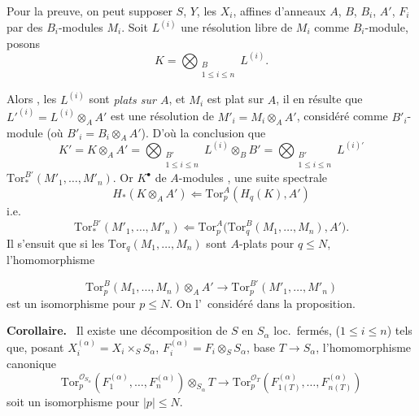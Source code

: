 \documentclass[11pt,a4paper]{article}
\begin{document}
 Pour la preuve, on peut supposer 
$S$, $Y$, les $X_i$, affines d'anneaux $A$, $B$, $B_i$, $A'$, 
$F_i$  par  des $B_i$-modules $M_i$. Soit
$L^{(i)}$ une résolution libre de $M_i$ comme $B_i$-module, posons
\[
  K = \bigotimes_{\substack{B \\ 1 \le i \le n}} L^{(i)} .
\]

Alors \struck{\ill{}}, les $L^{(i)}$ sont \emph{plats sur $A$}, et
 $M_i$ est plat sur $A$, il en résulte que
$L'^{(i)} = L^{(i)} \otimes_A A'$ est une résolution de
$M'_i = M_i \otimes_A A'$, considéré comme $B'_i$-module (où
$B'_i = B_i \otimes_A A'$). D'où la conclusion que
\[
  K' = K \otimes_A A' = \bigotimes_{\substack{B' \\ 1 \le i \le n}}
  L^{(i)} \otimes_B B' = \bigotimes_{\substack{B' \\ 1 \le i \le n}} L^{(i)\prime}
\]
  $\mathrm{Tor}_{*}^{B'}(M'_1, \ldots,
M'_n)$. Or $K^{\bullet}$  de $A$-modules
,  une suite spectrale
\[
  H_{*}(K \otimes_A A') \Longleftarrow \mathrm{Tor}_p^A(H_q(K), A')
\]
i.e.
\[
  \mathrm{Tor}_{*}^{B'}(M'_1, \ldots, M'_n) \Longleftarrow
  \mathrm{Tor}_p^A\bigl(\mathrm{Tor}_q^B(M_1, \ldots, M_n), A'\bigr) .
\]
Il s'ensuit que si les $\mathrm{Tor}_q(M_1, \ldots, M_n)$ sont $A$-plats
pour $q \le N$,  l'homomorphisme 
\ill{} \ill{}

\[
  \mathrm{Tor}_p^B(M_1, \ldots, M_n) \otimes_A A' \longrightarrow
  \mathrm{Tor}_p^{B'}(M'_1, \ldots, M'_n)
\]
est un isomorphisme pour $p \le N$. On  
 l'\ considéré dans la proposition.

\textbf{Corollaire.} \ Il existe une
décomposition  de $S$ en \ill{} $S_\alpha$ loc.\
fermés, ($1 \le i \le n$) tels que, posant
$X_i^{(\alpha)} = X_i \times_S S_\alpha$,
$F_i^{(\alpha)} = F_i \otimes_S S_\alpha$, 
\add{on ait ceci : pour tt changement de} base $T \to S_\alpha$,
l'homomorphisme canonique
\[
  \mathrm{Tor}_p^{\mathcal{O}_{S_\alpha}}(F_1^{(\alpha)}, \ldots, F_n^{(\alpha)})
  \otimes_{S_\alpha} T \longrightarrow
  \mathrm{Tor}_p^{\mathcal{O}_T}(F^{(\alpha)}_{1(T)}, \ldots, F^{(\alpha)}_{n(T)})
\]
soit un isomorphisme pour $|p| \le N$.
\end{document}
